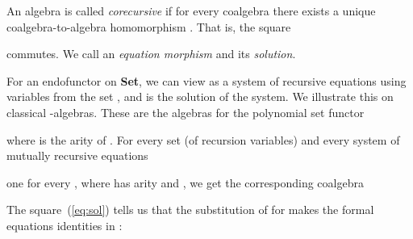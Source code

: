 \documentclass{LMCS}
\theoremstyle{plain}
\theoremstyle{definition}
\numberwithin{equation}{section}
\begin{document}
\begin{defi}\label{def of cor.alg}
An algebra  is called {\it corecursive} if for every coalgebra  there exists a unique coalgebra-to-algebra homomorphism . That is, the square

commutes. We call  an {\it equation morphism} and  its {\it solution}.
\end{defi}
\begin{rem}
 For an endofunctor on {\bf Set}, we can view  as a system of recursive equations using variables from the set , and  is the solution of the system. We illustrate this on classical -algebras. These are the algebras for the polynomial set functor

where  is the arity of . For every set  (of recursion variables) and every system of mutually recursive equations

one for every , where  has arity  and , we get the corresponding coalgebra

The square~(\ref{eq:sol}) tells us that the substitution of  for  makes the formal equations  identities in :

\end{rem}
\end{document}
